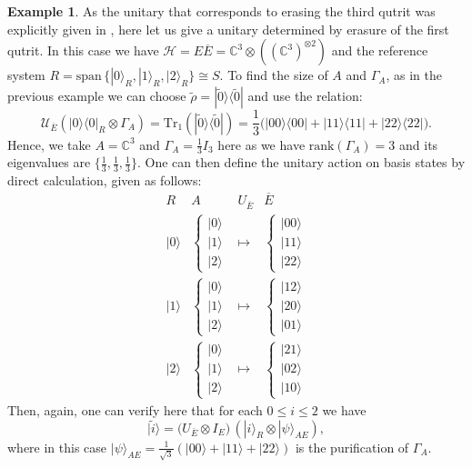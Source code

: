 \documentclass[11pt]{amsart}
\theoremstyle{definition}
\newtheorem{example}[thm]{Example}
\theoremstyle{definition}
\theoremstyle{definition}
\newcommand{\tr}{\textrm{Tr}}
\newcommand{\1}{\mathbb{I}}
\def\ket#1{| #1 \rangle}
\def\kb#1#2{|#1\rangle\!\langle #2 |}
\begin{document}
\begin{example}
As the unitary that corresponds to erasing the third qutrit was explicitly given in \cite{AXH15}, here let us give a unitary determined by erasure of the first qutrit. In this case we have $\mathcal H = E \overline{E} = \mathbb C^3 \otimes ( (\mathbb C^3)^{\otimes 2} )$ and the reference system $R = \mathrm{span} \, \{ \ket{0}_R, \ket{1}_R, \ket{2}_R \} \cong S$. To find the size of $A$ and $\Gamma_A$, as in the previous example we can choose $\widetilde{\rho} = \kb{\widetilde{0}}{\widetilde{0}}$ and use the relation:  
\[
\mathcal U_{\overline{E}} (\kb{0}{0}_R \otimes \Gamma_A) = \tr_1 (\kb{\widetilde{0}}{\widetilde{0}} )  = \frac13 \big( \kb{00}{00} +   \kb{11}{11} + \kb{22}{22}  \big) . 
\]
Hence, we take $A = \mathbb C^3$ and $\Gamma_A = \frac13 I_3$ here as we have $\mathrm{rank}(\Gamma_A)=3$ and its eigenvalues are $\{ \frac13, \frac13, \frac13 \}$.  
One can then define the unitary action on basis states by direct calculation, given as follows: 
\[
\begin{array}{cccc} 
R & A & U_{\overline{E}}  & \overline{E}  \\ \hline 
\ket{0} & \left\{ \begin{array}{l}  \ket{0} \\ \ket{1} \\ \ket{2} \end{array} \right. & \longmapsto & \left\{ \begin{array}{l}  \ket{00} \\ \ket{11} \\ \ket{22} \end{array} \right. \\ 
\ket{1} & \left\{ \begin{array}{l}  \ket{0} \\ \ket{1} \\ \ket{2} \end{array} \right. & \longmapsto & \left\{ \begin{array}{l}  \ket{12} \\ \ket{20} \\ \ket{01}  \end{array} \right. \\  
\ket{2} & \left\{ \begin{array}{l}  \ket{0} \\ \ket{1} \\ \ket{2} \end{array} \right. & \longmapsto & \left\{ \begin{array}{l}  \ket{21} \\ \ket{02} \\ \ket{10}  \end{array} \right.  
\end{array} 
\]
Then, again, one can verify here that for each $0 \leq i \leq 2$ we have 
\[
  \ket{\widetilde{i}} = \big( U_{\overline{E}} \otimes I_E \big) \, ( \ket{i}_R \otimes \ket{\psi}_{A E}),  
\]
where in this case $\ket{\psi}_{AE} = \frac{1}{\sqrt{3}} (\ket{00} + \ket{11} + \ket{22})$ is the purification of $\Gamma_A$. 
\end{example}
\end{document}
